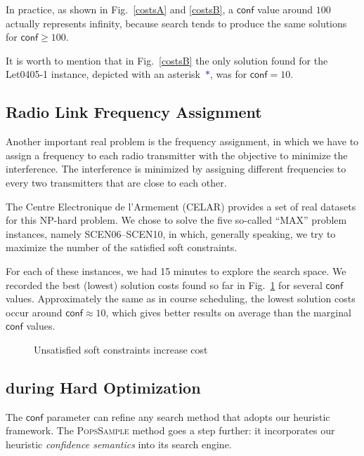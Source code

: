 \documentclass{ws-ijait}
\begin{document}
In practice, as shown in Fig.\ \ref{costsA} and \ref{costsB}, a $\mathsf{conf}$ value around $100$ actually represents infinity, because search tends to produce the same solutions for $\mathsf{conf} \geq 100$.

It is worth to mention that in Fig.~\ref{costsB} the only solution found for the \textsf{Let0405-1} instance, depicted with an asterisk~\textcolor{blue}{$*$}, was for $\mathsf{conf} = 10$.


\subsection{Radio Link Frequency Assignment}

Another important real problem is the frequency assignment, in which we have to assign a frequency to each radio transmitter with the objective to minimize the interference. The interference is minimized by assigning different frequencies to every two transmitters that are close to each other.

The Centre Electronique de l'Armement (CELAR) provides a set of real datasets for this NP-hard problem.\cite{radio-link} We chose to solve the five so-called ``MAX'' problem instances, namely \textsf{SCEN06}--\textsf{SCEN10}, in which, generally speaking, we try to maximize the number of the satisfied soft constraints.

For each of these instances, we had 15 minutes to explore the search space. We recorded the best (lowest) solution costs found so far in Fig.~\ref{CELAR} for several $\mathsf{conf}$ values. Approximately the same as in course scheduling, the lowest solution costs occur around $\mathsf{conf} \approx 10$, which gives better results on average than the marginal $\mathsf{conf}$ values.

\begin{figure}
\centering

\caption{Unsatisfied soft constraints increase cost\label{CELAR}}
\end{figure}


\subsection{\PopsSample{} during Hard Optimization\label{PoPS}}

The $\mathsf{conf}$ parameter can refine any search method that adopts our heuristic framework. The \textsc{PopsSample} method goes a step further: it incorporates our heuristic \emph{confidence semantics} into its search engine.
\end{document}
